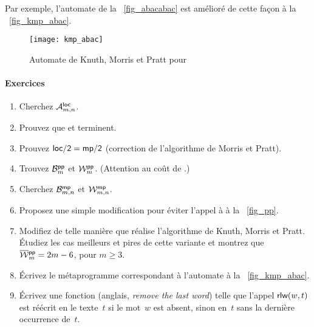 Par exemple, l'automate de la \fig~\vref{fig_abacabac} est amélioré de
cette façon à la \fig~\vref{fig_kmp_abac}.
\begin{figure}
\centering
\texttt{[image: kmp\_abac]}
\caption{Automate de Knuth, Morris et Pratt pour 
\label{fig_kmp_abac}}
\end{figure}

\paragraph{Exercices}

\begin{enumerate}

  \item Cherchez \(\M{\fun{loc}}{m,n}\).

  \item Prouvez que  et  terminent.

  \item Prouvez \(\fun{loc/2} = \fun{mp/2}\) (correction de
    l'algorithme de Morris et Pratt).

  \item Trouvez \(\B{\fun{pp}}{m}\) et \(\W{\fun{pp}}{m}\). (Attention
    au coût de .)

  \item Cherchez \(\B{\fun{mp}}{m,n}\) et \(\W{\fun{mp}}{m,n}\).

  \item Proposez une simple modification pour éviter l'appel à
     à la \fig~\vref{fig_pp}.\label{factoring_trick}

  \item Modifiez  de telle manière que  réalise
    l'algorithme de Knuth, Morris et Pratt. Étudiez les cas meilleurs
    et pires de cette variante et montrez que \(\OW{\fun{pp}}{m} =
    2m-6\), pour \(m \geqslant 3\).

  \item Écrivez le métaprogramme correspondant à l'automate à la
    \fig~\vref{fig_kmp_abac}.

  \item Écrivez une fonction 
    (anglais, \emph{remove the last word}) telle que l'appel
    \(\fun{rlw}(w,t)\) est réécrit en le texte~\(t\) si le mot~\(w\)
    est absent, sinon en~\(t\) sans la dernière occurrence de~\(t\).

\end{enumerate}
